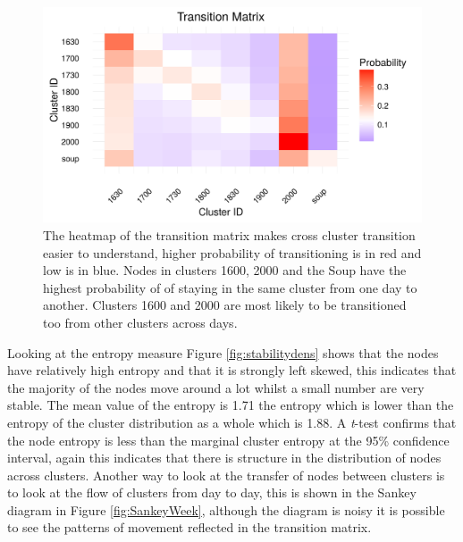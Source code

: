 \begin{figure}[ht]
    \centering
    \includegraphics[width= \textwidth]{Figures/Results/Clusttransgraph.png}
    \caption[Cluster family transition matrix]{The heatmap of the transition matrix makes cross cluster transition easier to understand, higher probability of transitioning is in red and low is in blue. Nodes in clusters 1600, 2000 and the Soup have the highest probability of of staying in the same cluster from one day to another. Clusters 1600 and 2000 are most likely to be transitioned too from other clusters across days.}
    \label{fig:TransitionHeat}
\end{figure}


Looking at the entropy measure Figure \ref{fig:stabilitydens} shows that the nodes have relatively high entropy and that it is strongly left skewed, this indicates that the majority of the nodes move around a lot whilst a small number are very stable. The mean value of the entropy is 1.71 the entropy which is lower than the entropy of the cluster distribution as a whole which is 1.88. A \textit{t}-test confirms that the node entropy is less than the marginal cluster entropy at the 95\% confidence interval, again this indicates that there is structure in the distribution of nodes across clusters. Another way to look at the transfer of nodes between clusters is to look at the flow of clusters from day to day, this is shown in the Sankey diagram in  Figure \ref{fig:SankeyWeek}, although the diagram is noisy it is possible to see the patterns of movement reflected in the transition matrix.


